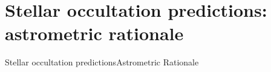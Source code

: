 \section{Stellar occultation predictions: astrometric rationale}
\begin{frame}[c]{Stellar occultation predictions}{Astrometric Rationale}

%	


\end{frame}
